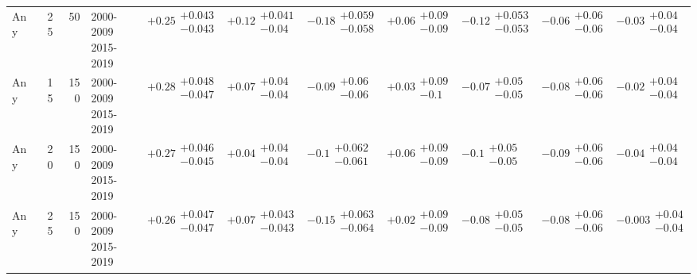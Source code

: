 \begin{table}[H]
\begin{tabular}{lrrllllllll}
Any & 25 & 50 & \makecell{2000-2009 \\ 2015-2019} & $\bm{+0.25}\substack{+0.043 \\ -0.043}$ & $\bm{+0.12}\substack{+0.041 \\ -0.04}$ & $\bm{-0.18}\substack{+0.059 \\ -0.058}$ & $+0.06\substack{+0.09 \\ -0.09}$ & $\bm{-0.12}\substack{+0.053 \\ -0.053}$ & $\bm{-0.06}\substack{+0.06 \\ -0.06}$ & $-0.03\substack{+0.04 \\ -0.04}$ \\
Any & 15 & 150 & \makecell{2000-2009 \\ 2015-2019} & $\bm{+0.28}\substack{+0.048 \\ -0.047}$ & $\bm{+0.07}\substack{+0.04 \\ -0.04}$ & $\bm{-0.09}\substack{+0.06 \\ -0.06}$ & $+0.03\substack{+0.09 \\ -0.1}$ & $\bm{-0.07}\substack{+0.05 \\ -0.05}$ & $\bm{-0.08}\substack{+0.06 \\ -0.06}$ & $-0.02\substack{+0.04 \\ -0.04}$ \\
Any & 20 & 150 & \makecell{2000-2009 \\ 2015-2019} & $\bm{+0.27}\substack{+0.046 \\ -0.045}$ & $\bm{+0.04}\substack{+0.04 \\ -0.04}$ & $\bm{-0.1}\substack{+0.062 \\ -0.061}$ & $+0.06\substack{+0.09 \\ -0.09}$ & $\bm{-0.1}\substack{+0.05 \\ -0.05}$ & $\bm{-0.09}\substack{+0.06 \\ -0.06}$ & $\bm{-0.04}\substack{+0.04 \\ -0.04}$ \\
Any & 25 & 150 & \makecell{2000-2009 \\ 2015-2019} & $\bm{+0.26}\substack{+0.047 \\ -0.047}$ & $\bm{+0.07}\substack{+0.043 \\ -0.043}$ & $\bm{-0.15}\substack{+0.063 \\ -0.064}$ & $+0.02\substack{+0.09 \\ -0.09}$ & $\bm{-0.08}\substack{+0.05 \\ -0.05}$ & $\bm{-0.08}\substack{+0.06 \\ -0.06}$ & $-0.003\substack{+0.04 \\ -0.04}$ \\
\bottomrule
\end{tabular}\normalsize\renewcommand{\arraystretch}{1}
\end{table}



